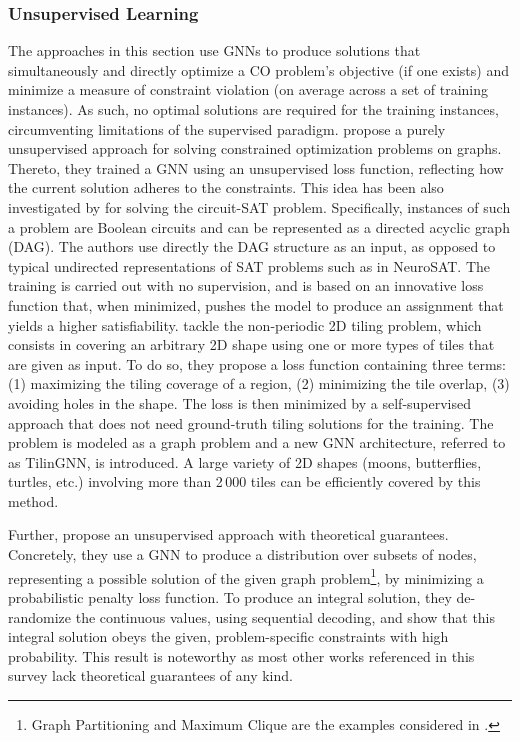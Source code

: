 \documentclass[twoside,11pt]{article}
\begin{document}
\subsubsection{Unsupervised Learning}
The approaches in this section use GNNs to produce solutions that simultaneously and directly optimize a CO problem's objective (if one exists) and minimize a measure of constraint violation (on average across a set of training instances). As such, no optimal solutions are required for the training instances, circumventing limitations of the supervised paradigm.
\citet{Toe+2019} propose a purely unsupervised approach for solving constrained optimization problems on graphs. Thereto, they trained a GNN using an unsupervised loss function, reflecting how the current solution adheres to the constraints. This idea has been also investigated by \citet{amizadeh2018learning} for solving the circuit-SAT problem. Specifically,
instances of such a problem are Boolean circuits and can be represented as a directed acyclic graph (DAG). The authors use directly the DAG structure as an input, as opposed to typical undirected representations of SAT problems such as in NeuroSAT. The training is carried out with no supervision, and is based on an innovative loss function that, when minimized,
pushes the model to produce an assignment that yields a higher satisfiability.
\citet{xu2020tilingnn} tackle the non-periodic 2D tiling problem, which consists in covering an arbitrary 2D shape using one or more types of tiles that are given as input.
To do so, they propose a loss function containing three terms: (1) maximizing the tiling coverage of a region, (2) minimizing the tile overlap, (3) avoiding holes in the shape.
The loss is then minimized by a self-supervised approach that does not need ground-truth tiling solutions for the training. 
The problem is modeled as a graph problem and a new GNN architecture, referred to as TilinGNN, is introduced.
A large variety of 2D shapes (moons, butterflies, turtles, etc.) involving more than 2\,000 tiles can be efficiently covered by this method.

Further, \citet{Kar+2020} propose an unsupervised approach with theoretical guarantees. Concretely, they use a GNN to produce a distribution over subsets of nodes, representing a possible solution of the given graph problem\footnote{Graph Partitioning and Maximum Clique are the examples considered in \citep{Kar+2020}.}, by minimizing a probabilistic penalty loss function. To produce an integral solution, they de-randomize the continuous values, using sequential decoding, and show that this integral solution obeys the given, problem-specific constraints with high probability. This result is noteworthy as most other works referenced in this survey lack theoretical guarantees of any kind.
\end{document}
